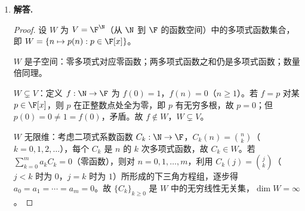 \begin{enumerate}[label=\textbf{\arabic*.}, leftmargin=*, itemsep=1em]
\begin{proof}
$\F[x]=E+O$：任意 $f=\sum_{k\ge 0}a_kx^k$，令 $f_e=\sum_{k\text{ 偶}}a_kx^k\in E$，$f_o=\sum_{k\text{ 奇}}a_kx^k\in O$，则 $f=f_e+f_o$。

$E\cap O=\{\mathbf{0}\}$：若 $g\in E\cap O$，则 $g$ 的奇次系数全为零（由 $g\in E$）且偶次系数全为零（由 $g\in O$），故 $g=0$。

综合得 $\F[x]=E\oplus O$。
\end{proof}

\item \textbf{解答.}
\begin{proof}
设 $W$ 为 $V=\F^\N$（从 $\N$ 到 $\F$ 的函数空间）中的多项式函数集合，即 $W=\{n\mapsto p(n):p\in\F[x]\}$。

$W$ 是子空间：零多项式对应零函数；两多项式函数之和仍是多项式函数；数量倍同理。

$W\subsetneq V$：定义 $f:\N\to\F$ 为 $f(0)=1$，$f(n)=0$（$n\ge 1$）。若 $f=p$ 对某 $p\in\F[x]$，则 $p$ 在正整数点处全为零，即 $p$ 有无穷多根，故 $p=0$；但 $p(0)=0\ne 1=f(0)$，矛盾。故 $f\notin W$，$W\subsetneq V$。

$W$ 无限维：考虑二项式系数函数 $C_k:\N\to\F$，$C_k(n)=\binom{n}{k}$（$k=0,1,2,\dots$），每个 $C_k$ 是 $n$ 的 $k$ 次多项式函数，故 $C_k\in W$。若 $\sum_{k=0}^m a_kC_k=0$（零函数），则对 $n=0,1,\dots,m$，利用 $C_k(j)=\binom{j}{k}$（$j<k$ 时为 $0$，$j=k$ 时为 $1$）所形成的下三角方程组，逐步得 $a_0=a_1=\cdots=a_m=0$。故 $\{C_k\}_{k\ge 0}$ 是 $W$ 中的无穷线性无关集，$\dim W=\infty$。
\end{proof}

\end{enumerate}
